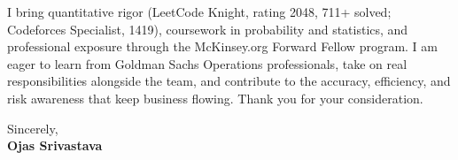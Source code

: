 \documentclass[a4paper,11pt]{article}
\begin{document}
I bring quantitative rigor (LeetCode Knight, rating 2048, 711+ solved; Codeforces Specialist, 1419), coursework in probability and statistics, and professional exposure through the McKinsey.org Forward Fellow program. I am eager to learn from Goldman Sachs Operations professionals, take on real responsibilities alongside the team, and contribute to the accuracy, efficiency, and risk awareness that keep business flowing. Thank you for your consideration.

Sincerely, \\
\vspace{8mm}
\textbf{Ojas Srivastava}
\end{document}
